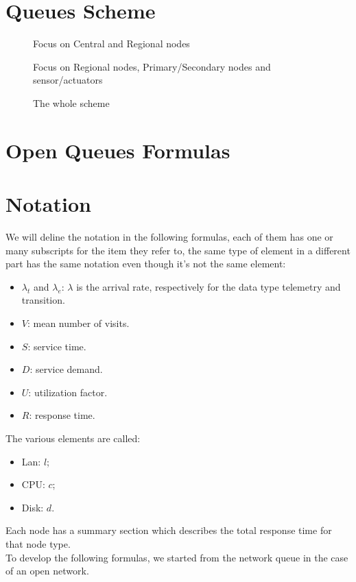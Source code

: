 \documentclass[11pt]{article}
\begin{document}
\section{Queues Scheme}
\begin{figure}[H]
	\hspace*{-3.75cm}
	\frame{}
	\caption{Focus on Central and Regional nodes}
\end{figure}
\begin{figure}[H]
	\hspace*{-3.75cm}
	\frame{}
	\caption{Focus on Regional nodes, Primary/Secondary nodes and sensor/actuators}
\end{figure}
\begin{figure}[H]
	\vspace*{-0.5cm}
	\hspace*{-3.75cm}
	\frame{}
	\caption{The whole scheme}
\end{figure}

\section{Open Queues Formulas}

\section{Notation}
We will deline the notation in the following formulas, each of them has one or many subscripts for the item they refer to, the same type of element in a different part has the same notation even though it's not the same element:
\begin{itemize}
\item $\lambda_t$ and $\lambda_e$: $\lambda$ is the arrival rate, respectively for the data type telemetry and transition.
\item $V$: mean number of visits.
\item $S$: service time.
\item $D$: service demand.
\item $U$: utilization factor.
\item $R$: response time.
\end{itemize}

The various elements are called:
\begin{itemize}
\item Lan: $l$;
\item CPU: $c$;
\item Disk: $d$.
\end{itemize}
Each node has a summary section which describes the total response time for that node type.\\
To develop the following formulas, we started from the network queue in the case of an open network.
\end{document}
